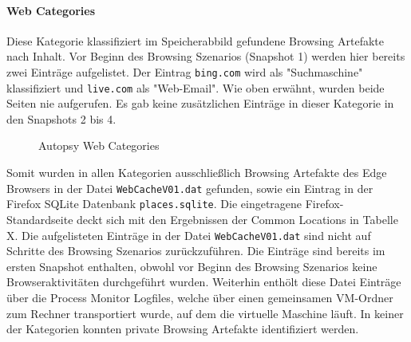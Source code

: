 \paragraph*{Web Categories}
Diese Kategorie klassifiziert im Speicherabbild gefundene Browsing Artefakte nach Inhalt.
Vor Beginn des Browsing Szenarios (Snapshot 1) werden hier bereits zwei Einträge aufgelistet. Der Eintrag \texttt{bing.com} wird als "Suchmaschine" klassifiziert und \texttt{live.com} als "Web-Email".
Wie oben erwähnt, wurden beide Seiten nie aufgerufen. Es gab keine zusätzlichen Einträge in dieser Kategorie in den Snapshots 2 bis 4.
\begin{figure}[h!]
	\centerline{}
	\label{chart:final-criteria}  
	\caption{Autopsy Web Categories}
\end{figure}
		

Somit wurden in allen Kategorien ausschließlich Browsing Artefakte des Edge Browsers in der Datei \texttt{WebCacheV01.dat} gefunden, sowie ein Eintrag in der Firefox SQLite Datenbank \texttt{places.sqlite}. Die eingetragene Firefox-Standardseite deckt sich mit den Ergebnissen der Common Locations in Tabelle X. Die aufgelisteten Einträge in der Datei \texttt{WebCacheV01.dat} sind nicht auf Schritte des Browsing Szenarios zurückzuführen. Die Einträge sind bereits im ersten Snapshot enthalten, obwohl vor Beginn des Browsing Szenarios keine Browseraktivitäten durchgeführt wurden. Weiterhin enthölt diese Datei Einträge über die Process Monitor Logfiles, welche über einen gemeinsamen VM-Ordner zum Rechner transportiert wurde, auf dem die virtuelle Maschine läuft.
In keiner der Kategorien konnten private Browsing Artefakte identifiziert werden.

